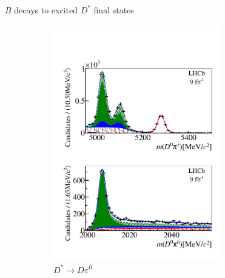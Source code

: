 \documentclass[xcolor={dvipsnames}]{beamer}
\begin{document}
\begin{frame}{$B$ decays to excited $D^*$ final states}
  \begin{figure}
    \centering
    \begin{subfigure}{0.5\textwidth}
      \centering
      \includegraphics[width = 0.8\textwidth]{Plots/massfitPage_canvas_pi0_d2kspipi_b2dpi_LL_merge_BtoDstpi.pdf}
      \caption*{$D^*\to D\pi^0$}
    \end{subfigure}%
    \begin{subfigure}{0.5\textwidth}
      \centering

\end{subfigure}
\end{figure}
\end{frame}
\end{document}
